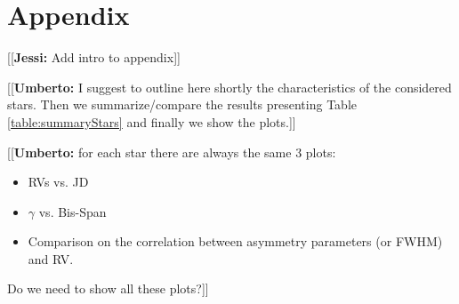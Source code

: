 \documentclass[11pt, oneside]{article}
\newcommand{\jessi}[1]{{\color{Purple}[[\textbf{Jessi: }#1]]}}
\newcommand{\umberto}[1]{{\color{green}[[\textbf{Umberto: }#1]]}}
\begin{document}
\appendix
\section{Appendix} \label{appendix}

\jessi{Add intro to appendix}

\umberto{I suggest to outline here shortly the characteristics of the considered stars. Then we summarize/compare the results presenting Table \ref{table:summaryStars} and finally we show the plots.}
\umberto{for each star there are always the same $3$ plots: 
\begin{itemize}
\item RVs vs. JD
\item $\gamma$ vs. Bis-Span
\item Comparison on the correlation between asymmetry parameters (or FWHM) and RV.
\end{itemize}

Do we need to show all these plots?}
\end{document}
